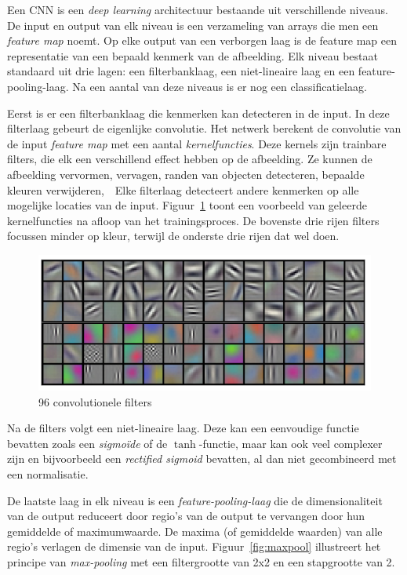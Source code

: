 Een CNN is een \emph{deep learning} architectuur bestaande uit verschillende niveaus. De input en output van elk niveau is een verzameling van arrays die men een \emph{feature map} noemt. Op elke output van een verborgen laag is de feature map een representatie van een bepaald kenmerk van de afbeelding. Elk niveau bestaat standaard uit drie lagen: een filterbanklaag, een niet-lineaire laag en een feature-pooling-laag. Na een aantal van deze niveaus is er nog een classificatielaag.

Eerst is er een filterbanklaag die kenmerken kan detecteren in de input. In deze filterlaag gebeurt de eigenlijke convolutie. Het netwerk berekent de convolutie van de input \emph{feature map} met een aantal \emph{kernelfuncties}. Deze kernels zijn trainbare filters, die elk een verschillend effect hebben op de afbeelding. Ze kunnen de afbeelding vervormen, vervagen, randen van objecten detecteren, bepaalde kleuren verwijderen,~\textellipsis\  Elke filterlaag detecteert andere kenmerken op alle mogelijke locaties van de input. Figuur~\ref{fig:cnnfilters} toont een voorbeeld van geleerde kernelfuncties na afloop van het trainingsproces. De bovenste drie rijen filters focussen minder op kleur, terwijl de onderste drie rijen dat wel doen.

\begin{figure}[tb]
    \centering
    \includegraphics[width=.7\textwidth]{Images/cnnfilters.png}
    \caption[96 convolutionele filters]{96 convolutionele filters~\cite{Krizhevsky2012a}}
    \label{fig:cnnfilters}
\end{figure}

Na de filters volgt een niet-lineaire laag. Deze kan een eenvoudige functie bevatten zoals een \emph{sigmo\"ide} of de $\tanh$-functie, maar kan ook veel complexer zijn en bijvoorbeeld een \emph{rectified sigmoid} bevatten, al dan niet gecombineerd met een normalisatie.

De laatste laag in elk niveau is een \emph{feature-pooling-laag} die de dimensionaliteit van de output reduceert door regio's van de output te vervangen door hun gemiddelde of maximumwaarde. De maxima (of gemiddelde waarden) van alle regio's verlagen de dimensie van de input. Figuur~\ref{fig:maxpool} illustreert het principe van \emph{max-pooling} met een filtergrootte van 2x2 en een stapgrootte van 2. 

